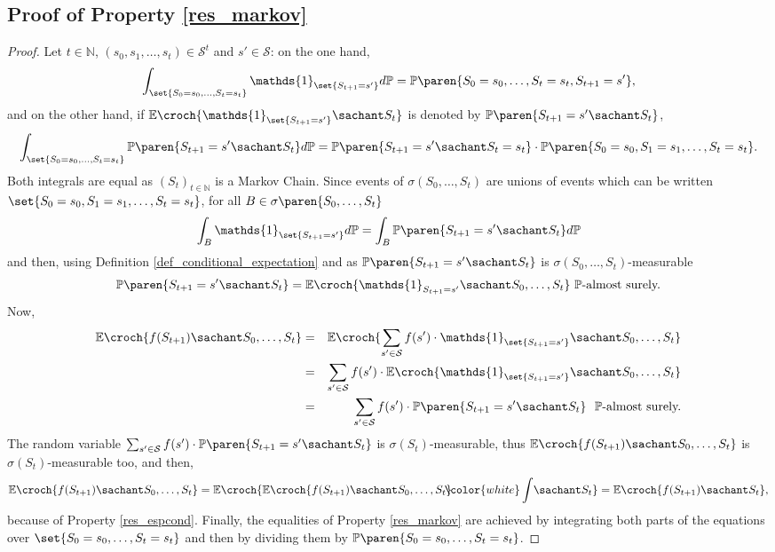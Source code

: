 \subsection{Proof of Property \ref{res_markov}}
\label{res_markov_RETURN}
\begin{proof}
Let $t \in \mathbb{N}$, $(s_0,s_1,\ldots,s_t) \in \mathcal{S}^t$ and $s' \in \mathcal{S}$: 
on the one hand,
\begin{equation*}
\int_{ \set{ S_0=s_0,\ldots,S_t=s_t } } \mathds{1}_{ \set{S_{t+1} =s'}} d \mathbb{P} = \mathbb{P} \paren{ S_0=s_0,\ldots,S_t=s_t,S_{t+1}=s' },
\end{equation*}
and on the other hand, if $\mathbb{E} \croch{ \mathds{1}_{\set{S_{t+1} = s'}} \sachant S_t }$ 
is denoted by $\mathbb{P} \paren{ S_{t+1} = s' \sachant S_t }$,
\[ \displaystyle \int_{ \set{ S_0=s_0,\ldots,S_t=s_t } } \mathbb{P} \paren{ S_{t+1} = s' \sachant S_t } d \mathbb{P} 
= \mathbb{P} \paren{ S_{t+1} = s' \sachant S_t=s_t } \cdot \mathbb{P} \paren{ S_0=s_0,S_1=s_1,\ldots,S_t=s_t }.\]
Both integrals are equal as $(S_t)_{t \in \mathbb{N}}$ is a Markov Chain. 
Since events of $\sigma(S_0,\ldots,S_t)$ are unions of events which can be written $ \set{S_0=s_0,S_1=s_1,\ldots,S_t=s_t}$, 
for all $B \in \sigma \paren{ S_0,\ldots,S_t }$
\[ \int_B \mathds{1}_{ \set{S_{t+1} =s'}} d \mathbb{P} = \int_B  \mathbb{P}  \paren{ S_{t+1} = s' \sachant S_t }  d \mathbb{P}  \]
and then, using Definition \ref{def_conditional_expectation} and as 
$ \mathbb{P}  \paren{ S_{t+1} = s' \sachant S_t }$ is $\sigma(S_0,\ldots,S_t)$-measurable
\[ \mathbb{P}  \paren{ S_{t+1} = s' \sachant S_t } = \mathbb{E} \croch{ \mathds{1}_{S_{t+1} =s'} \sachant S_0,\ldots,S_t  } \ \mathbb{P}\mbox{-almost surely.} \]
Now, 
\begin{eqnarray*}
\mathbb{E} \croch{ f(S_{t+1}) \sachant S_0,\ldots,S_t } 
& = & \mathbb{E} \croch{ \sum_{s' \in \mathcal{S}} f(s') \cdot \mathds{1}_{ \set{S_{t+1}=s'} }  \sachant S_0,\ldots,S_t } \\
& = & \sum_{s' \in \mathcal{S}} f(s') \cdot \mathbb{E} \croch{ \mathds{1}_{\set{S_{t+1}=s'}}  \sachant S_0,\ldots,S_t } \\
& = & \sum_{s' \in \mathcal{S}} f(s') \cdot \mathbb{P} \paren{ S_{t+1}=s'  \sachant S_t } \ \ \mathbb{P}\mbox{-almost surely.} %
\end{eqnarray*}
The random variable $\sum_{s' \in \mathcal{S}} f(s') \cdot \mathbb{P} \paren{ S_{t+1}=s'  \sachant S_t }$ 
is $\sigma(S_t)$-measurable, thus $\mathbb{E} \croch{ f(S_{t+1}) \sachant S_0,\ldots,S_t } $
is $\sigma(S_t)$-measurable too, and then,
\[ \mathbb{E} \croch{ f(S_{t+1}) \sachant S_0,\ldots,S_t }  = \mathbb{E} \croch{ \mathbb{E} \croch{ f(S_{t+1}) \sachant S_0,\ldots,S_t } \hspace{-0.23cm} {\color{white} \int} \sachant S_t } = \mathbb{E} \croch{ f(S_{t+1}) \sachant S_t },  \]
because of Property \ref{res_espcond}.
Finally, the equalities of Property \ref{res_markov} are achieved 
by integrating both parts of the equations 
over $\set{S_0 = s_0, \ldots, S_t = s_t}$
and then by dividing them 
by $\mathbb{P} \paren{ S_0 = s_0, \ldots, S_t = s_t }$.
\end{proof}

